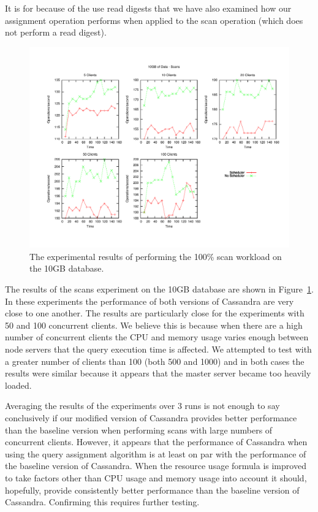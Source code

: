 \begin{enumerate}
It is for because of the use read digests that we have also examined how our assignment operation performs when applied to the scan operation (which does not perform a read digest).

\end{enumerate}

\begin{figure}[t]
\centering
\includegraphics[scale=0.5]{images/10GB_Scans.pdf}
\vspace{-15pt}
\caption{The experimental results of performing the 100\% scan workload on the 10GB database.}
\label{fig:10g_scans}
\end{figure}

The results of the scans experiment on the 10GB database are shown in Figure~\ref{fig:10g_scans}. In these experiments the performance of both versions of Cassandra are very close to one another. The results are particularly close for the experiments with 50 and 100 concurrent clients. We believe this is because when there are a high number of concurrent clients the CPU and memory usage varies enough between node servers that the query execution time is affected. We attempted to test with a greater number of clients than 100 (both 500 and 1000) and in both cases the results were similar because it appears that the master server became too heavily loaded.

Averaging the results of the experiments over 3 runs is not enough to say conclusively if our modified version of Cassandra provides better performance than the baseline version when performing scans with large numbers of concurrent clients. However, it appears that the performance of Cassandra when using the query assignment algorithm is at least on par with the performance of the baseline version of Cassandra. When the resource usage formula is improved to take factors other than CPU usage and memory usage into account it should, hopefully, provide consistently better performance than the baseline version of Cassandra. Confirming this requires further testing.

